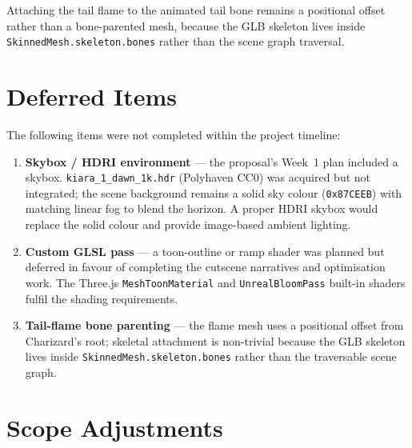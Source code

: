 \documentclass[11pt,a4paper]{article}
\begin{document}
Attaching the tail flame to the animated tail bone remains a positional offset
rather than a bone-parented mesh, because the GLB skeleton lives inside
\texttt{SkinnedMesh.skeleton.bones} rather than the scene graph traversal.

\section{Deferred Items}

The following items were not completed within the project timeline:

\begin{enumerate}[leftmargin=*, label=\arabic*.]
    \item \textbf{Skybox / HDRI environment} --- the proposal's Week~1 plan
          included a skybox. \texttt{kiara\_1\_dawn\_1k.hdr} (Polyhaven CC0) was
          acquired but not integrated; the scene background remains a solid sky
          colour (\texttt{0x87CEEB}) with matching linear fog to blend the
          horizon. A proper HDRI skybox would replace the solid colour and
          provide image-based ambient lighting.
    \item \textbf{Custom GLSL pass} --- a toon-outline or ramp shader was planned
          but deferred in favour of completing the cutscene narratives and
          optimisation work. The Three.js \texttt{MeshToonMaterial} and
          \texttt{UnrealBloomPass} built-in shaders fulfil the shading
          requirements.
    \item \textbf{Tail-flame bone parenting} --- the flame mesh uses a positional
          offset from Charizard's root; skeletal attachment is non-trivial
          because the GLB skeleton lives inside
          \texttt{SkinnedMesh.skeleton.bones} rather than the traversable scene
          graph.
\end{enumerate}

\section{Scope Adjustments}
\end{document}
